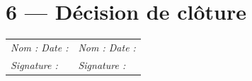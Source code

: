 \documentclass[11pt,a4paper,oneside]{report}
\begin{document}
\section*{6 — Décision de clôture}

\renewcommand{\arraystretch}{2.5}
\begin{tabularx}{\textwidth}{Y Y}
\toprule
{} &  \\
\midrule
\textit{Nom : \hfill Date :} & \textit{Nom : \hfill Date :} \\
\textit{Signature :} & \textit{Signature :} \\
\bottomrule
\end{tabularx}
\end{document}
